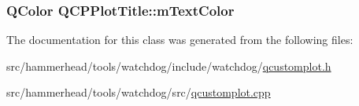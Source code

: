 \subsubsection[{\texorpdfstring{m\+Text\+Color}{mTextColor}}]{\setlength{\rightskip}{0pt plus 5cm}Q\+Color Q\+C\+P\+Plot\+Title\+::m\+Text\+Color\hspace{0.3cm}{\ttfamily [protected]}}\hypertarget{classQCPPlotTitle_a5d7f834d6522c1a72fb0682c0b7ebe13}{}\label{classQCPPlotTitle_a5d7f834d6522c1a72fb0682c0b7ebe13}


The documentation for this class was generated from the following files\+:\begin{DoxyCompactItemize}
\item 
src/hammerhead/tools/watchdog/include/watchdog/\hyperlink{qcustomplot_8h}{qcustomplot.\+h}\item 
src/hammerhead/tools/watchdog/src/\hyperlink{qcustomplot_8cpp}{qcustomplot.\+cpp}\end{DoxyCompactItemize}
